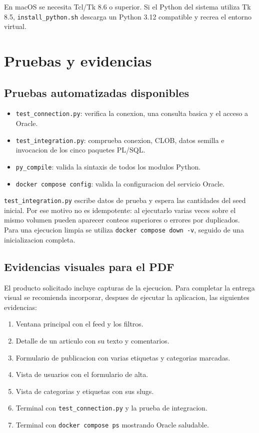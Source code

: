 \documentclass[12pt,a4paper]{article}
\begin{document}
En macOS se necesita Tcl/Tk 8.6 o superior. Si el Python del sistema utiliza
Tk 8.5, \texttt{install\_python.sh} descarga un Python 3.12 compatible y
recrea el entorno virtual.

\section{Pruebas y evidencias}

\subsection{Pruebas automatizadas disponibles}

\begin{itemize}
    \item \texttt{test\_connection.py}: verifica la conexion, una consulta
    basica y el acceso a Oracle.
    \item \texttt{test\_integration.py}: comprueba conexion, CLOB, datos
    semilla e invocacion de los cinco paquetes PL/SQL.
    \item \texttt{py\_compile}: valida la sintaxis de todos los modulos
    Python.
    \item \texttt{docker compose config}: valida la configuracion del servicio
    Oracle.
\end{itemize}

\texttt{test\_integration.py} escribe datos de prueba y espera las cantidades
del seed inicial. Por ese motivo no es idempotente: al ejecutarlo varias veces
sobre el mismo volumen pueden aparecer conteos superiores o errores por
duplicados. Para una ejecucion limpia se utiliza
\texttt{docker compose down -v}, seguido de una inicializacion completa.

\subsection{Evidencias visuales para el PDF}

El producto solicitado incluye capturas de la ejecucion. Para completar la
entrega visual se recomienda incorporar, despues de ejecutar la aplicacion,
las siguientes evidencias:

\begin{enumerate}
    \item Ventana principal con el feed y los filtros.
    \item Detalle de un articulo con su texto y comentarios.
    \item Formulario de publicacion con varias etiquetas y categorias marcadas.
    \item Vista de usuarios con el formulario de alta.
    \item Vista de categorias y etiquetas con sus slugs.
    \item Terminal con \texttt{test\_connection.py} y la prueba de integracion.
    \item Terminal con \texttt{docker compose ps} mostrando Oracle saludable.
\end{enumerate}
\end{document}
